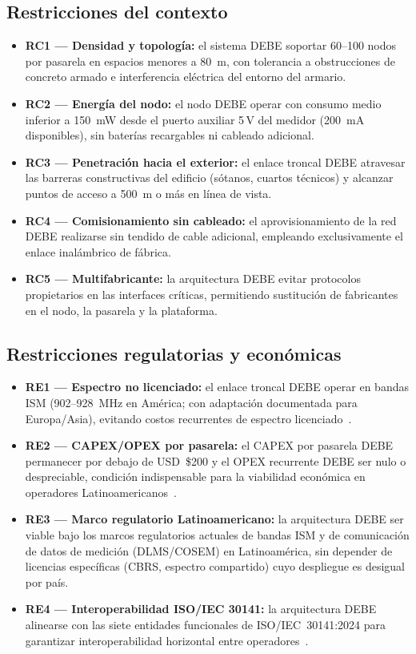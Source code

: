 \subsection{Restricciones del contexto}
\label{sec:req-contexto}

\begin{itemize}
    \item \textbf{RC1 --- Densidad y topología:} el sistema DEBE soportar 60--100 nodos por pasarela en espacios menores a 80~m, con tolerancia a obstrucciones de concreto armado e interferencia eléctrica del entorno del armario.
    \item \textbf{RC2 --- Energía del nodo:} el nodo DEBE operar con consumo medio inferior a 150~mW desde el puerto auxiliar 5\,V del medidor (200~mA disponibles), sin baterías recargables ni cableado adicional.
    \item \textbf{RC3 --- Penetración hacia el exterior:} el enlace troncal DEBE atravesar las barreras constructivas del edificio (sótanos, cuartos técnicos) y alcanzar puntos de acceso a 500~m o más en línea de vista.
    \item \textbf{RC4 --- Comisionamiento sin cableado:} el aprovisionamiento de la red DEBE realizarse sin tendido de cable adicional, empleando exclusivamente el enlace inalámbrico de fábrica.
    \item \textbf{RC5 --- Multifabricante:} la arquitectura DEBE evitar protocolos propietarios en las interfaces críticas, permitiendo sustitución de fabricantes en el nodo, la pasarela y la plataforma.
\end{itemize}

\subsection{Restricciones regulatorias y económicas}
\label{sec:req-regulatorias-economicas}

\begin{itemize}
    \item \textbf{RE1 --- Espectro no licenciado:} el enlace troncal DEBE operar en bandas ISM (902--928~MHz en América; con adaptación documentada para Europa/Asia), evitando costos recurrentes de espectro licenciado~\cite{IEEE802.11ah-2016}.
    \item \textbf{RE2 --- CAPEX/OPEX por pasarela:} el CAPEX por pasarela DEBE permanecer por debajo de USD~\$200 y el OPEX recurrente DEBE ser nulo o despreciable, condición indispensable para la viabilidad económica en operadores Latinoamericanos~\cite{hossainComparativeStudyIoTCommunication2018}.
    \item \textbf{RE3 --- Marco regulatorio Latinoamericano:} la arquitectura DEBE ser viable bajo los marcos regulatorios actuales de bandas ISM y de comunicación de datos de medición (DLMS/COSEM) en Latinoamérica, sin depender de licencias específicas (CBRS, espectro compartido) cuyo despliegue es desigual por país.
    \item \textbf{RE4 --- Interoperabilidad ISO/IEC 30141:} la arquitectura DEBE alinearse con las siete entidades funcionales de ISO/IEC~30141:2024 para garantizar interoperabilidad horizontal entre operadores~\cite{ISOIEC30141v2024}.
\end{itemize}

